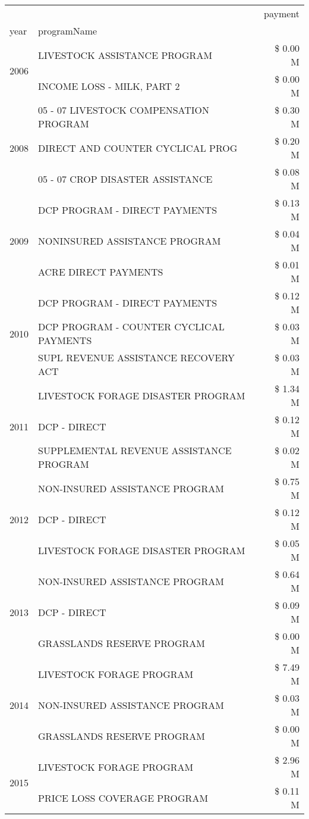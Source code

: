 \begin{tabular}{llr}
\toprule
 &  & payment \\
year & programName &  \\
\midrule
\multirow[t]{2}{*}{2006} & LIVESTOCK ASSISTANCE PROGRAM & \$ 0.00 M \\
 & INCOME LOSS - MILK, PART 2 & \$ 0.00 M \\
\cline{1-3}
\multirow[t]{3}{*}{2008} & 05 - 07 LIVESTOCK COMPENSATION PROGRAM & \$ 0.30 M \\
 & DIRECT AND COUNTER CYCLICAL PROG & \$ 0.20 M \\
 & 05 - 07 CROP DISASTER ASSISTANCE & \$ 0.08 M \\
\cline{1-3}
\multirow[t]{3}{*}{2009} & DCP PROGRAM - DIRECT PAYMENTS & \$ 0.13 M \\
 & NONINSURED ASSISTANCE PROGRAM & \$ 0.04 M \\
 & ACRE DIRECT PAYMENTS & \$ 0.01 M \\
\cline{1-3}
\multirow[t]{3}{*}{2010} & DCP PROGRAM - DIRECT PAYMENTS & \$ 0.12 M \\
 & DCP PROGRAM - COUNTER CYCLICAL PAYMENTS & \$ 0.03 M \\
 & SUPL REVENUE ASSISTANCE RECOVERY ACT & \$ 0.03 M \\
\cline{1-3}
\multirow[t]{3}{*}{2011} & LIVESTOCK FORAGE DISASTER PROGRAM & \$ 1.34 M \\
 & DCP - DIRECT & \$ 0.12 M \\
 & SUPPLEMENTAL REVENUE ASSISTANCE PROGRAM & \$ 0.02 M \\
\cline{1-3}
\multirow[t]{3}{*}{2012} & NON-INSURED ASSISTANCE PROGRAM & \$ 0.75 M \\
 & DCP - DIRECT & \$ 0.12 M \\
 & LIVESTOCK FORAGE DISASTER PROGRAM & \$ 0.05 M \\
\cline{1-3}
\multirow[t]{3}{*}{2013} & NON-INSURED ASSISTANCE PROGRAM & \$ 0.64 M \\
 & DCP - DIRECT & \$ 0.09 M \\
 & GRASSLANDS RESERVE PROGRAM & \$ 0.00 M \\
\cline{1-3}
\multirow[t]{3}{*}{2014} & LIVESTOCK FORAGE PROGRAM & \$ 7.49 M \\
 & NON-INSURED ASSISTANCE PROGRAM & \$ 0.03 M \\
 & GRASSLANDS RESERVE PROGRAM & \$ 0.00 M \\
\cline{1-3}
\multirow[t]{3}{*}{2015} & LIVESTOCK FORAGE PROGRAM & \$ 2.96 M \\
 & PRICE LOSS COVERAGE PROGRAM & \$ 0.11 M \\

\end{tabular}
